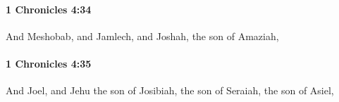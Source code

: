 		\paragraph{1 Chronicles 4:34} %
			\label{1CHRONICLES-4-34}

			And Meshobab, and Jamlech, and Joshah, the son of Amaziah,


		\paragraph{1 Chronicles 4:35} %
			\label{1CHRONICLES-4-35}

			And Joel, and Jehu the son of Josibiah, the son of Seraiah, the son of Asiel,


